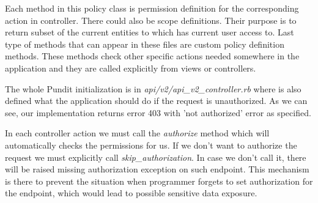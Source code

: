 Each method in this policy class is permission definition for the corresponding action in controller. There could also be scope definitions. Their purpose is to return subset of the current entities to which has current user access to. Last type of methods that can appear in these files are custom policy definition methods. These methods check other specific actions needed somewhere in the application and they are called explicitly from views or controllers.

The whole Pundit initialization is in \textit{api/v2/api\_v2\_controller.rb} where is also defined what the application should do if the request is unauthorized. As we can see, our implementation returns error 403 with 'not authorized' error as specified.

In each controller action we must call the \textit{authorize} method which will automatically checks the permissions for us. If we don't want to authorize the request we must explicitly call \textit{skip\_authorization}. In case we don't call it, there will be raised missing authorization exception on such endpoint. This mechanism is there to prevent the situation when programmer forgets to set authorization for the endpoint, which would lead to possible sensitive data exposure.
